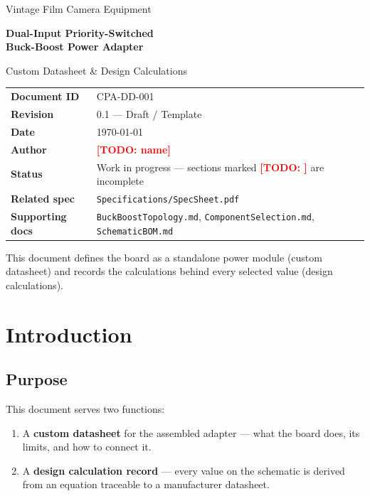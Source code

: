 \documentclass[11pt,a4paper]{article}
\newcommand{\todo}[1]{\textcolor{red}{\textbf{[TODO: #1]}}}
\begin{document}
\begin{titlepage}
  \hypersetup{pageanchor=false}
  \centering
  \vspace*{2cm}

  {\Large Vintage Film Camera Equipment\par}
  \vspace{0.5cm}
  {\Huge\bfseries Dual-Input Priority-Switched\\[0.3cm] Buck-Boost Power Adapter\par}
  \vspace{1.0cm}
  {\LARGE Custom Datasheet \& Design Calculations\par}
  \vspace{2.0cm}

  \begin{tabularx}{0.98\textwidth}{@{}lX@{}}
    \toprule
    \textbf{Document ID}     & CPA-DD-001 \\[2pt]
    \textbf{Revision}        & 0.1 --- Draft / Template \\[2pt]
    \textbf{Date}            & \today \\[2pt]
    \textbf{Author}          & \todo{name} \\[2pt]
    \textbf{Status}          & Work in progress --- sections marked \todo{} are incomplete \\[2pt]
    \textbf{Related spec}    & \texttt{Specifications/SpecSheet.pdf} \\[2pt]
    \textbf{Supporting docs} & \texttt{BuckBoostTopology.md}, \texttt{ComponentSelection.md}, \texttt{SchematicBOM.md} \\
    \bottomrule
  \end{tabularx}

  \vfill
  {\small This document defines the board as a standalone power module (custom datasheet) and
   records the calculations behind every selected value (design calculations).}
\end{titlepage}
\hypersetup{pageanchor=true}

\tableofcontents
\newpage

\section{Introduction}

\subsection{Purpose}
This document serves two functions:
\begin{enumerate}[nosep]
  \item A \textbf{custom datasheet} for the assembled adapter --- what the board
        does, its limits, and how to connect it.
  \item A \textbf{design calculation record} --- every value on the schematic is
        derived from an equation traceable to a manufacturer datasheet.
\end{enumerate}
\end{document}
